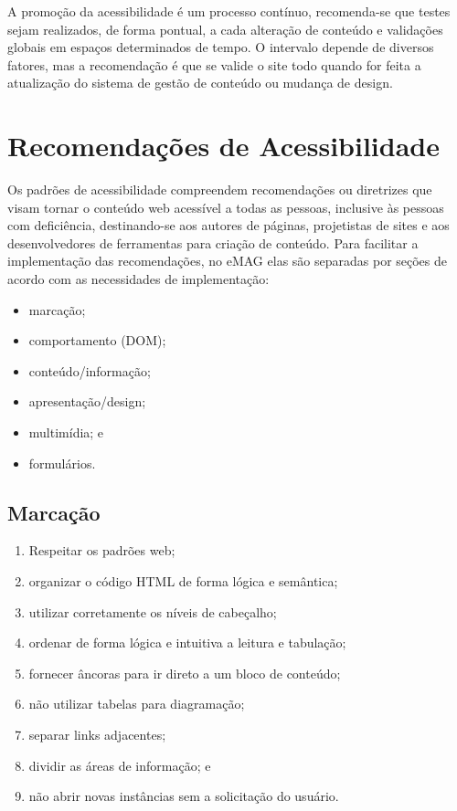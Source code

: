 \documentclass[
  12pt,
  openright,
  twoside,
  a4paper,
  english,
  french,
  spanish,
  brazil
]{abntex2}
\begin{document}
A promoção da acessibilidade é um processo contínuo, recomenda-se que testes
sejam realizados, de forma pontual, a cada alteração de conteúdo e validações
globais em espaços determinados de tempo. O intervalo depende de diversos
fatores, mas a recomendação é que se valide o site todo quando for feita a
atualização do sistema de gestão de conteúdo ou mudança de design.

\section{Recomendações de Acessibilidade}

Os padrões de acessibilidade compreendem recomendações ou diretrizes que visam
tornar o conteúdo web acessível a todas as pessoas, inclusive às pessoas com
deficiência, destinando-se aos autores de páginas, projetistas de sites e aos
desenvolvedores de ferramentas para criação de conteúdo. Para facilitar a
implementação das recomendações, no eMAG elas são separadas por seções de acordo
com as necessidades de implementação:

\begin{itemize}
  \item marcação;
  \item comportamento (DOM);
  \item conteúdo/informação;
  \item apresentação/design;
  \item multimídia; e
  \item formulários.
\end{itemize}

\subsection{Marcação}

\begin{enumerate}
  \item Respeitar os padrões web;
  \item organizar o código HTML de forma lógica e semântica;
  \item utilizar corretamente os níveis de cabeçalho;
  \item ordenar de forma lógica e intuitiva a leitura e tabulação;
  \item fornecer âncoras para ir direto a um bloco de conteúdo;
  \item não utilizar tabelas para diagramação;
  \item separar links adjacentes;
  \item dividir as áreas de informação; e
  \item não abrir novas instâncias sem a solicitação do usuário.
\end{enumerate}
\end{document}
